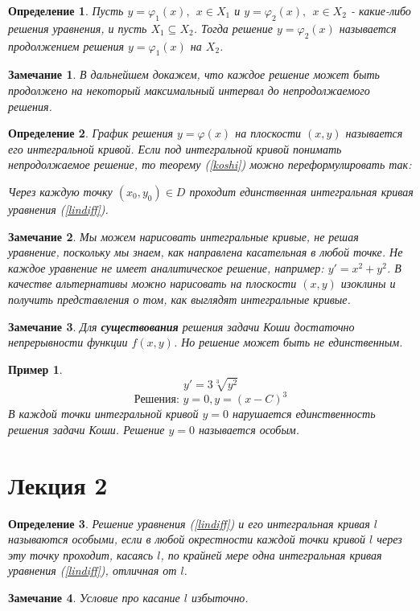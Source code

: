 \documentclass{article}
\newtheorem*{df}{Определение}
\newtheorem*{ntc}{Замечание}
\newtheorem{xmp}{Пример}
\begin{document}
  \begin{df}
  Пусть $ y = \varphi_1(x),~~ x \in X_1 $ и $ y = \varphi_2(x),~~ x \in X_2 $ - какие-либо решения уравнения, и пусть $ X_1 \subseteq X_2 $. Тогда решение $ y = \varphi_2(x) $ называется продолжением решения $ y = \varphi_1(x) $ на $X_2$.
  \end{df} 
  \begin{ntc}
  В дальнейшем докажем, что каждое решение может быть продолжено на некоторый максимальный интервал до непродолжаемого решения.
  \end{ntc}
  
  \begin{df}
  График решения $ y = \varphi(x) $ на плоскости $(x, y)$  называется его интегральной кривой. Если под интегральной кривой понимать непродолжаемое решение, то теорему (\ref{koshi}) можно переформулировать так:
  
  Через каждую точку $(x_0, y_0) \in D$ проходит единственная интегральная кривая уравнения (\ref{lindiff}). 
  \end{df}
  
  \begin{ntc}
  Мы можем нарисовать интегральные кривые, не решая уравнение, поскольку мы знаем, как направлена касательная в любой точке.
  Не каждое уравнение не имеет аналитическое решение, например: $ y' = x^2 + y^2 $. В качестве альтернативы можно нарисовать на плоскости $(x, y)$ изоклины и получить представления о том, как выглядят интегральные кривые.
  \end{ntc}
  
  \begin{ntc}
  Для \textbf{существования} решения задачи Коши достаточно непрерывности функции $f(x, y)$. Но решение может быть не единственным.
  \end{ntc}
  
  \begin{xmp}
  $$ y' = 3\sqrt[3]{y^2} $$
  $$ \text{Решения: } y = 0, y = (x - C)^3 $$ В каждой точки интегральной кривой $y = 0$ нарушается единственность решения задачи Коши. Решение $y = 0$ называется особым. 
  \end{xmp}

  \section{Лекция 2}
  \begin{df}
  Решение уравнения (\ref{lindiff}) и его интегральная кривая $l$ называются особыми, если в любой окрестности каждой точки кривой $l$ через эту точку проходит, касаясь $l$, по крайней мере одна интегральная кривая уравнения (\ref{lindiff}), отличная от $l$.
  \end{df}
  \begin{ntc}
  Условие про касание $l$ избыточно.
  \end{ntc}
  
\end{document}
